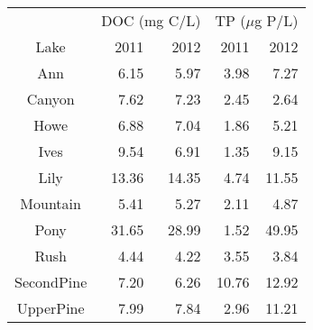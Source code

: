 \begin{table}[ht]
\centering
\begin{tabular}{crrrr}
  \hline
\hline
  & \multicolumn{2}{c}{DOC (mg C/L)} & 
                      \multicolumn{2}{c}{TP ($\mu$g P/L)} \\
 Lake & 2011 & 2012 & 2011 & 2012 \\
 \hline
Ann & 6.15 & 5.97 & 3.98 & 7.27 \\ 
  Canyon & 7.62 & 7.23 & 2.45 & 2.64 \\ 
  Howe & 6.88 & 7.04 & 1.86 & 5.21 \\ 
  Ives & 9.54 & 6.91 & 1.35 & 9.15 \\ 
  Lily & 13.36 & 14.35 & 4.74 & 11.55 \\ 
  Mountain & 5.41 & 5.27 & 2.11 & 4.87 \\ 
  Pony & 31.65 & 28.99 & 1.52 & 49.95 \\ 
  Rush & 4.44 & 4.22 & 3.55 & 3.84 \\ 
  SecondPine & 7.20 & 6.26 & 10.76 & 12.92 \\ 
  UpperPine & 7.99 & 7.84 & 2.96 & 11.21 \\ 
   \hline
\end{tabular}
\end{table}
